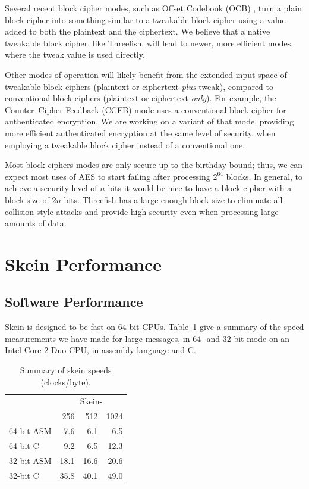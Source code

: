 \documentclass[11pt,twoside]{article}
\begin{document}
Several recent block cipher modes, such as Offset Codebook (OCB) \cite{RBB03}, turn a plain block cipher into something similar to a tweakable block cipher using a value added to both the plaintext and the ciphertext. We believe that a native tweakable block cipher, like Threefish, will lead to newer, more efficient modes, where the tweak value is used directly.

Other modes of operation will likely benefit from the extended input space of tweakable block ciphers (plaintext or ciphertext \emph{plus} tweak), compared to conventional block ciphers (plaintext or ciphertext \emph{only}). For example, the Counter--Cipher Feedback (CCFB) mode \cite{L05} uses a conventional block cipher for authenticated encryption. We are working on a variant of that mode, providing more efficient authenticated encryption at the same level of security, when employing a tweakable block cipher instead of a conventional one.

Most block ciphers modes are only secure up to the birthday bound; thus, we can expect most uses of AES to start failing after processing $2^{64}$ blocks. In general, to achieve a security level of $n$ bits it would be nice to have a block cipher with a block size of $2n$ bits.  Threefish has a large enough block size to eliminate all collision-style attacks and provide high security even when processing large amounts of data.

\section{Skein Performance}\label{sec:perf}

\subsection{Software Performance}

Skein is designed to be fast on 64-bit CPUs.  Table~\ref{tab:SkeinSpeedSummary} give a summary of the speed measurements we have made for large messages, in 64- and 32-bit mode on an Intel Core 2 Duo CPU, in assembly language and C.

\begin{table}[htb]
  \begin{center}
    \begin{tabular}{|l|rrr|}
    \hline
     & \multicolumn{3}{c|}{Skein-} \\
                &  256  & 512 &  1024 \\
    \hline
    64-bit ASM  &  7.6 &  6.1 &  6.5 \\
    64-bit C    &  9.2 &  6.5 & 12.3 \\
    32-bit ASM  & 18.1 & 16.6 & 20.6 \\
    32-bit C    & 35.8 & 40.1 & 49.0 \\
    \hline
    \end{tabular}
   \end{center}\caption{Summary of skein speeds (clocks/byte).}
  \label{tab:SkeinSpeedSummary}
\end{table}
\end{document}
